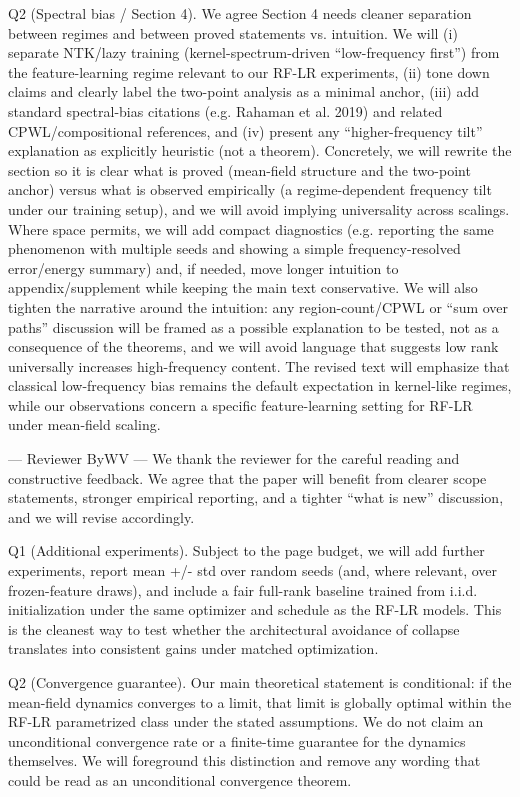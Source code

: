 Q2 (Spectral bias / Section 4). We agree Section 4 needs cleaner separation between regimes and between proved statements vs. intuition. We will (i) separate NTK/lazy training (kernel-spectrum-driven “low-frequency first”) from the feature-learning regime relevant to our RF-LR experiments, (ii) tone down claims and clearly label the two-point analysis as a minimal anchor, (iii) add standard spectral-bias citations (e.g. Rahaman et al. 2019) and related CPWL/compositional references, and (iv) present any “higher-frequency tilt” explanation as explicitly heuristic (not a theorem). Concretely, we will rewrite the section so it is clear what is proved (mean-field structure and the two-point anchor) versus what is observed empirically (a regime-dependent frequency tilt under our training setup), and we will avoid implying universality across scalings.
Where space permits, we will add compact diagnostics (e.g. reporting the same phenomenon with multiple seeds and showing a simple frequency-resolved error/energy summary) and, if needed, move longer intuition to appendix/supplement while keeping the main text conservative.
We will also tighten the narrative around the intuition: any region-count/CPWL or “sum over paths” discussion will be framed as a possible explanation to be tested, not as a consequence of the theorems, and we will avoid language that suggests low rank universally increases high-frequency content. The revised text will emphasize that classical low-frequency bias remains the default expectation in kernel-like regimes, while our observations concern a specific feature-learning setting for RF-LR under mean-field scaling.


--- Reviewer ByWV ---
We thank the reviewer for the careful reading and constructive feedback. We agree that the paper will benefit from clearer scope statements, stronger empirical reporting, and a tighter “what is new” discussion, and we will revise accordingly.

Q1 (Additional experiments). Subject to the page budget, we will add further experiments, report mean +/- std over random seeds (and, where relevant, over frozen-feature draws), and include a fair full-rank baseline trained from i.i.d. initialization under the same optimizer and schedule as the RF-LR models. This is the cleanest way to test whether the architectural avoidance of collapse translates into consistent gains under matched optimization.

Q2 (Convergence guarantee). Our main theoretical statement is conditional: if the mean-field dynamics converges to a limit, that limit is globally optimal within the RF-LR parametrized class under the stated assumptions. We do not claim an unconditional convergence rate or a finite-time guarantee for the dynamics themselves. We will foreground this distinction and remove any wording that could be read as an unconditional convergence theorem.

